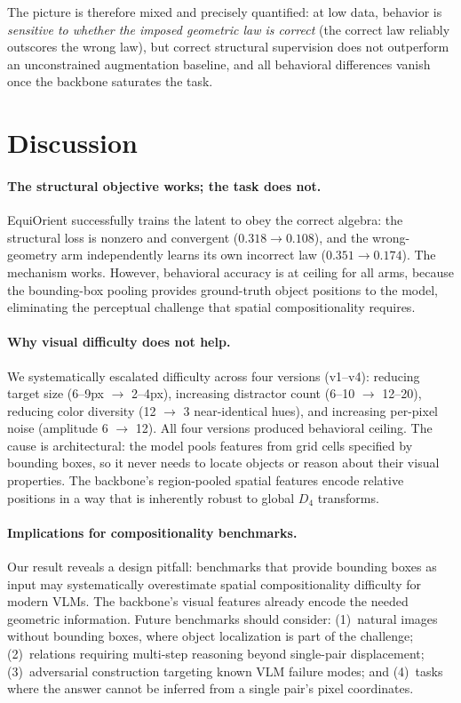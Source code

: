 \documentclass[10pt,twocolumn,letterpaper]{article}
\begin{document}
The picture is therefore mixed and precisely quantified: at low data,
behavior is \emph{sensitive to whether the imposed geometric law is
correct} (the correct law reliably outscores the wrong law), but
correct structural supervision does not outperform an unconstrained
augmentation baseline, and all behavioral differences vanish once the
backbone saturates the task.

\section{Discussion}

\paragraph{The structural objective works; the task does not.}
EquiOrient successfully trains the latent to obey the correct algebra:
the structural loss is nonzero and convergent ($0.318 \to 0.108$), and
the wrong-geometry arm independently learns its own incorrect law
($0.351 \to 0.174$). The mechanism works. However, behavioral accuracy
is at ceiling for all arms, because the bounding-box pooling provides
ground-truth object positions to the model, eliminating the perceptual
challenge that spatial compositionality requires.

\paragraph{Why visual difficulty does not help.}
We systematically escalated difficulty across four versions (v1--v4):
reducing target size (6--9px $\to$ 2--4px), increasing distractor
count (6--10 $\to$ 12--20), reducing color diversity (12 $\to$ 3
near-identical hues), and increasing per-pixel noise (amplitude 6
$\to$ 12). All four versions produced behavioral ceiling. The cause
is architectural: the model pools features from grid cells specified
by bounding boxes, so it never needs to locate objects or reason about
their visual properties. The backbone's region-pooled spatial features
encode relative positions in a way that is inherently robust to global
$D_4$ transforms.

\paragraph{Implications for compositionality benchmarks.}
Our result reveals a design pitfall: benchmarks that provide bounding
boxes as input may systematically overestimate spatial compositionality
difficulty for modern VLMs. The backbone's visual features already
encode the needed geometric information. Future benchmarks should
consider: (1)~natural images without bounding boxes, where object
localization is part of the challenge; (2)~relations requiring
multi-step reasoning beyond single-pair displacement; (3)~adversarial
construction targeting known VLM failure modes; and (4)~tasks where
the answer cannot be inferred from a single pair's pixel coordinates.
\end{document}
